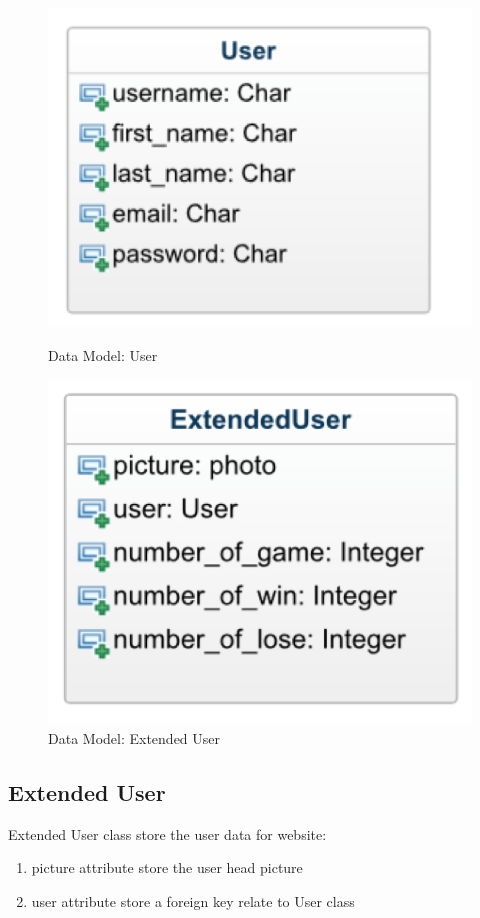 \documentclass[11pt]{article}
\begin{document}
\begin{figure}
\centering
\begin{minipage}{.5\linewidth}
\centering
\includegraphics[width=0.9\linewidth, keepaspectratio]{model-user.png}
\caption{Data Model: User}
\label{fig:func-gamenight}
\end{minipage}%
\begin{minipage}{.5\linewidth}
\centering
\includegraphics[width=0.9\linewidth, keepaspectratio]{model-euser.png}
\caption{Data Model: Extended User}
\label{fig:func-gamenight}
\end{minipage}
\end{figure}

\subsection{Extended User}
Extended User class store the user data for website:
\begin{enumerate}
\item
picture attribute store the user head picture
\item
user attribute store a foreign key relate to User class
\end{enumerate}
\end{document}
